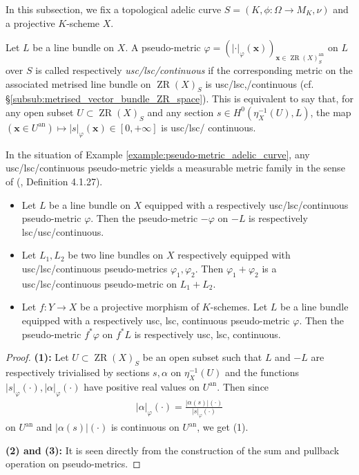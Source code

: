 \documentclass [11pt,reqno]{amsart}
\newcommand{\1}{\mathmybb{1}}
\def\an{\operatorname{an}}
\def\ZR{\operatorname{ZR}}
\begin{document}
In this subsection, we fix a topological adelic curve $S=(K,\phi:\Omega\to M_K,\nu)$ and a projective $K$-scheme $X$. 

\begin{definition}
\label{def:regularity_pseudo-metric_families}
Let $L$ be a line bundle on $X$. A pseudo-metric $\varphi=(|\cdot|_{\varphi}(\mathbf{x}))_{\mathbf{x}\in\ZR(X)_{S}^{\an}}$ on $L$ over $S$ is called respectively \emph{usc/lsc/continuous} if the corresponding metric on the associated metrised line bundle on $\ZR(X)_{S}$ is usc/lsc,/continuous (cf. \S \ref{subsub:metrised_vector_bundle_ZR_space}). This is equivalent to say that, for any open subset $U\subset\ZR(X)_{S}$ and any section $s\in H^{0}(\eta_{X}^{-1}(U),L)$, the map $(\mathbf{x}\in U^{\an})\mapsto |s|_{\varphi}(\mathbf{x})\in[0,+\infty]$ is usc/lsc/ continuous.
\end{definition}

\begin{remark}
\label{rem:regularity_pseudo-metric_adelic_curve}
In the situation of Example \ref{example:pseudo-metric_adelic_curve}, any usc/lsc/continuous pseudo-metric yields a measurable metric family in the sense of (\cite{ChenMori}, Definition 4.1.27).
\end{remark}

\begin{proposition}
\label{prop:regularity_pseudo-metric_families}
\begin{itemize}
	\item[(1)] Let $L$ be a line bundle on $X$ equipped with a respectively usc/lsc/continuous pseudo-metric $\varphi$. Then the pseudo-metric $-\varphi$ on $-L$ is respectively lsc/usc/continuous.
	\item[(2)] Let $L_1,L_2$ be two line bundles on $X$ respectively equipped with usc/lsc/continuous pseudo-metrics $\varphi_1,\varphi_2$. Then $\varphi_1+\varphi_2$ is a usc/lsc/continuous pseudo-metric on $L_1+L_2$.
	\item[(3)] Let $f : Y \to X$ be a projective morphism of $K$-schemes. Let $L$ be a line bundle equipped with a respectively usc, lsc, continuous pseudo-metric $\varphi$. Then the pseudo-metric $f^{\ast}\varphi$ on $f^{\ast}L$ is respectively usc, lsc, continuous.
\end{itemize}
\end{proposition}

\begin{proof}
\textbf{(1):} Let $U\subset\ZR(X)_{S}$ be an open subset such that $L$ and $-L$ are respectively trivialised by sections $s,\alpha$ on $\eta_{X}^{-1}(U)$ and the functions $|s|_{\varphi}(\cdot),|\alpha|_{\varphi}(\cdot)$ have positive real values on $U^{\an}$. Then since
\begin{align*}
|\alpha|_{\varphi}(\cdot)=\frac{|\alpha(s)|(\cdot)}{|s|_{\varphi}(\cdot)}
\end{align*}
on $U^{\an}$ and $|\alpha(s)|(\cdot)$ is continuous on $U^{\an}$, we get (1).

\textbf{(2) and (3):} It is seen directly from the construction of the sum and pullback operation on pseudo-metrics.
\end{proof}
\end{document}
